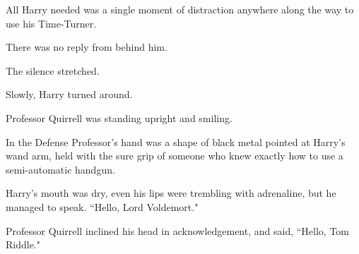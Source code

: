 All Harry needed was a single moment of distraction anywhere along the way to use his Time-Turner.

There was no reply from behind him.

The silence stretched.

Slowly, Harry turned around.

Professor Quirrell was standing upright and smiling.

In the Defense Professor's hand was a shape of black metal pointed at Harry's wand arm, held with the sure grip of someone who knew exactly how to use a semi-automatic handgun.

Harry's mouth was dry, even his lips were trembling with adrenaline, but he managed to speak. ``Hello, Lord Voldemort."

Professor Quirrell inclined his head in acknowledgement, and said, ``Hello, Tom Riddle."

